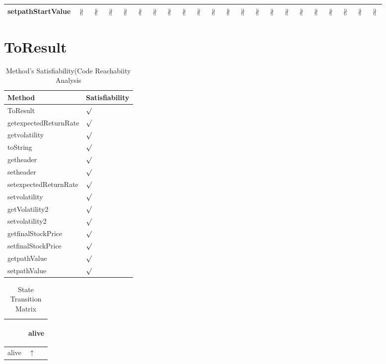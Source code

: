 \documentclass[10pt]{article}
\begin{document}
\begin{longtable}{|l|l|l|l|l|l|l|l|l|l|l|l|l|l|l|l|l|l|l|l|l|l|}
\hline
setpathStartValue&{\color{BrickRed}$\nparallel$}&{\color{BrickRed}$\nparallel$}&{\color{BrickRed}$\nparallel$}&{\color{BrickRed}$\nparallel$}&{\color{BrickRed}$\nparallel$}&{\color{BrickRed}$\nparallel$}&{\color{BrickRed}$\nparallel$}&{\color{BrickRed}$\nparallel$}&{\color{BrickRed}$\nparallel$}&{\color{BrickRed}$\nparallel$}&{\color{BrickRed}$\nparallel$}&{\color{BrickRed}$\nparallel$}&{\color{BrickRed}$\nparallel$}&{\color{BrickRed}$\nparallel$}&{\color{BrickRed}$\nparallel$}&{\color{BrickRed}$\nparallel$}&{\color{BrickRed}$\nparallel$}&{\color{BrickRed}$\nparallel$}&{\color{BrickRed}$\nparallel$}&{\color{BrickRed}$\nparallel$}&{\color{BrickRed}$\nparallel$}\\
\hline
\end{longtable}
\newpage

\section{{\color{Fuchsia}ToResult}}
\label{ToResult}
\begin{longtable}{|l|l|}
\caption{Method's Satisfiability(Code Reachabiity Analysis}\\
\hline
Method & Satisfiability\\
\hline
ToResult&{\color{blue}$\surd$}\\
\hline
getexpectedReturnRate&{\color{blue}$\surd$}\\
\hline
getvolatility&{\color{blue}$\surd$}\\
\hline
toString&{\color{blue}$\surd$}\\
\hline
getheader&{\color{blue}$\surd$}\\
\hline
setheader&{\color{blue}$\surd$}\\
\hline
setexpectedReturnRate&{\color{blue}$\surd$}\\
\hline
setvolatility&{\color{blue}$\surd$}\\
\hline
getVolatility2&{\color{blue}$\surd$}\\
\hline
setvolatility2&{\color{blue}$\surd$}\\
\hline
getfinalStockPrice&{\color{blue}$\surd$}\\
\hline
setfinalStockPrice&{\color{blue}$\surd$}\\
\hline
getpathValue&{\color{blue}$\surd$}\\
\hline
setpathValue&{\color{blue}$\surd$}\\
\hline
\end{longtable}
\begin{longtable}{|l|l|}
\caption{State Transition Matrix}\\
\hline
&\begin{sideways}alive\end{sideways}\\
\hline
alive&{\color{blue}$\uparrow$}\\
\hline
\end{longtable}
\end{document}
